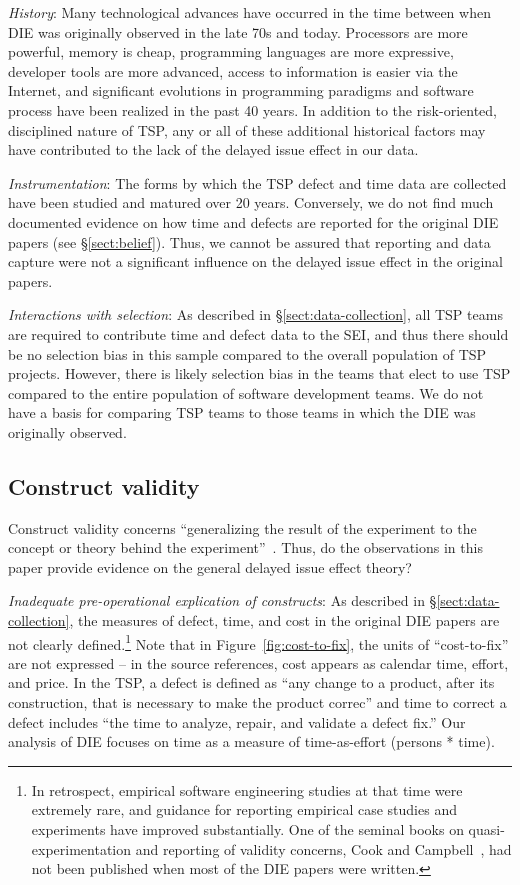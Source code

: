 \documentclass[smallcondensed]{svjour3}
\newcommand{\tion}[1]{\S\ref{sect:#1}}
\begin{document}
\textit{History}: Many technological advances have occurred in the time between when DIE was originally observed in the late 70s and today. Processors are more powerful, memory is cheap, programming languages are more expressive, developer tools are more advanced, access to information is easier via the Internet, and significant evolutions in programming paradigms and software process have been realized in the past 40 years. In addition to the risk-oriented, disciplined nature of TSP, any or all of these additional historical factors may have contributed to the lack of the delayed issue effect in our data. 

\textit{Instrumentation}: The forms by which the TSP defect and time data are collected have been studied and matured over 20 years. Conversely, we do not find much documented evidence on how time and defects are reported for the original DIE papers (see \tion{belief}). Thus, we cannot be assured that reporting and data capture were not a significant influence on the delayed issue effect in the original papers.

\textit{Interactions with selection}: As described in \tion{data-collection}, all TSP teams are required to contribute time and defect data to the SEI, and thus there should be no selection bias in this sample compared to the overall population of TSP projects. However, there is likely selection bias in the teams that elect to use TSP compared to the entire population of software development teams. We do not have a basis for comparing TSP teams to those teams in which the DIE was originally observed.


\subsection{Construct validity} \label{sect:construct}
Construct validity concerns ``generalizing the result of the experiment to the concept or theory behind the experiment''~\cite{wohlin2012}. Thus, do the observations in this paper provide evidence on the general delayed issue effect theory?

\textit{Inadequate pre-operational explication of constructs}: As described in \tion{data-collection}, the measures of defect, time, and cost in the original DIE papers are not clearly defined.\footnote{In retrospect, empirical software engineering studies at that time were extremely rare, and guidance for reporting empirical case studies and experiments have improved substantially. One of the seminal books on quasi-experimentation and reporting of validity concerns, Cook and Campbell~\cite{cook1979}, had not been published when most of the DIE papers were written.} Note that in Figure~\ref{fig:cost-to-fix}, the units of ``cost-to-fix'' are not expressed -- in the source references, cost appears as calendar time, effort, and price. In the TSP, a defect is defined as ``any change to a product, after its construction, that is necessary to make the product correc'' and time to correct a defect includes ``the time to analyze, repair, and validate a defect fix.'' Our analysis of DIE focuses on time as a measure of time-as-effort (persons * time). 
\end{document}

